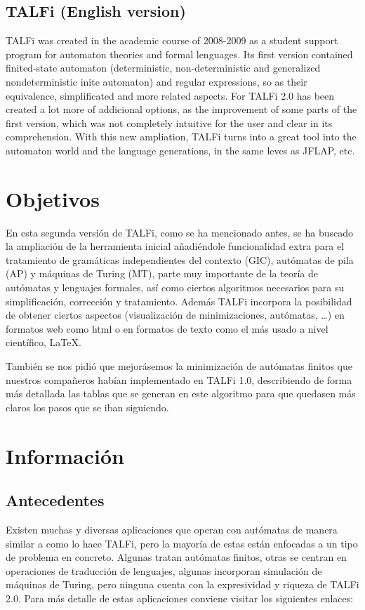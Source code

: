 \documentclass[12pt,a4paper,spanish]{book}
\newcommand{\clearemptydoublepage}{\newpage{\pagestyle{empty}\cleardoublepage}}
\begin{document}
\section{TALFi (English version)}
TALFi was created in the academic course of 2008-2009 as a student support program for automaton theories and formal lenguages.
Its first version contained finited-state automaton (deterministic, non-deterministic and generalized nondeterministic inite automaton) and regular expressions, so as their equivalence, simplificated and more related aspects.
For TALFi 2.0 has been created a lot more of addicional options, as the improvement of some parts of the first version, which was not completely intuitive for the user and clear in its comprehension.
With this new ampliation, TALFi turns into a great tool into the automaton world and the language generations, in the same leves as JFLAP, etc.

\clearemptydoublepage
\chapter{Objetivos}
En esta segunda versi\'on de TALFi, como se ha mencionado antes, se ha buscado la ampliaci\'on de la herramienta inicial a\~nadi\'endole funcionalidad extra para el tratamiento de gram\'aticas independientes del contexto (GIC), aut\'omatas de pila (AP) y m\'aquinas de Turing (MT), parte muy importante de la teor\'ia de aut\'omatas y lenguajes formales, as\'i como ciertos algoritmos necesarios para su simplificaci\'on, correcci\'on y tratamiento.
Adem\'as TALFi incorpora la posibilidad de obtener ciertos aspectos (visualizaci\'on de minimizaciones, aut\'omatas, \ldots) en formatos web como html o en formatos de texto como el m\'as usado a nivel cient\'ifico, \LaTeX{}.

Tambi\'en se nos pidi\'o que mejor\'asemos la minimizaci\'on de aut\'omatas finitos que nuestros compa\~neros hab\'ian implementado en TALFi 1.0, describiendo de forma m\'as detallada las tablas que se generan en este algoritmo para que quedasen m\'as claros los pasos que se iban siguiendo.

\clearemptydoublepage
\chapter{Informaci\'on}
\section{Antecedentes}
Existen muchas y diversas aplicaciones que operan con aut\'omatas de manera similar a como lo hace TALFi, pero la mayor\'ia de estas est\'an enfocadas a un tipo de problema en concreto.
Algunas tratan aut\'omatas finitos, otras se centran en operaciones de traducci\'on de lenguajes, algunas incorporan simulaci\'on de m\'aquinas de Turing, pero ninguna cuenta con la expresividad y riqueza de TALFi 2.0.
Para m\'as detalle de estas aplicaciones conviene visitar los siguientes enlaces:
\end{document}
